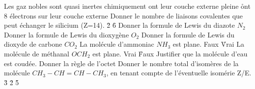 \q
Les gaz nobles
\rv
sont quasi inertes chimiquement
\rv
ont leur couche externe pleine
\r
ont 8 électrons sur leur couche externe
\q
Donner le nombre de liaisons covalentes que peut échanger le silicium (Z=14).
\r
2
\r
6
\q
Donner la formule de Lewis du diazote $N_2$
\q 
Donner la formule de Lewis du dioxygène $O_2$
\q
Donner la formule de Lewis du dioxyde de carbone $CO_2$
\q
La molécule d'ammoniac $NH_3$ est plane.
\rv
Faux
\r
Vrai
\q
La molécule de méthanal $OCH_2$ est plane.
\rv
Vrai
\r
Faux
\q
Justifier que la molécule d'eau est coudée.
\q
Donner la règle de l'octet
Donner le nombre total d'isomères de la molécule $CH_3-CH=CH-CH_3$, en tenant compte de l'éventuelle isomérie Z/E.
\r
3
\r
2
\r
5
